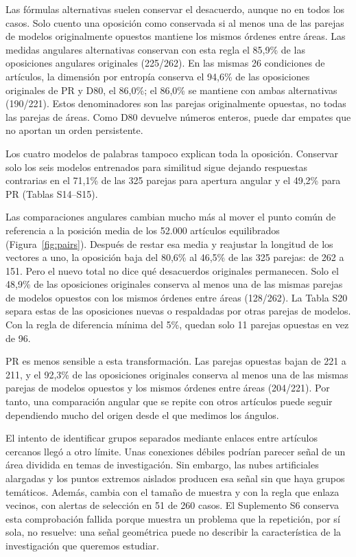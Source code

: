 \documentclass[12pt]{article}
\begin{document}
Las fórmulas alternativas suelen conservar el desacuerdo, aunque no en todos los casos. Solo cuento una oposición como conservada si al menos una de las parejas de modelos originalmente opuestos mantiene los mismos órdenes entre áreas. Las medidas angulares alternativas conservan con esta regla el 85,9\% de las oposiciones angulares originales (225/262). En las mismas 26 condiciones de artículos, la dimensión por entropía conserva el 94,6\% de las oposiciones originales de PR y D80, el 86,0\%; el 86,0\% se mantiene con ambas alternativas (190/221). Estos denominadores son las parejas originalmente opuestas, no todas las parejas de áreas. Como D80 devuelve números enteros, puede dar empates que no aportan un orden persistente.

Los cuatro modelos de palabras tampoco explican toda la oposición. Conservar solo los seis modelos entrenados para similitud sigue dejando respuestas contrarias en el 71,1\% de las 325 parejas para apertura angular y el 49,2\% para PR (Tablas S14--S15).

Las comparaciones angulares cambian mucho más al mover el punto común de referencia a la posición media de los 52.000 artículos equilibrados (Figura~\ref{fig:pairs}). Después de restar esa media y reajustar la longitud de los vectores a uno, la oposición baja del 80,6\% al 46,5\% de las 325 parejas: de 262 a 151. Pero el nuevo total no dice qué desacuerdos originales permanecen. Solo el 48,9\% de las oposiciones originales conserva al menos una de las mismas parejas de modelos opuestos con los mismos órdenes entre áreas (128/262). La Tabla S20 separa estas de las oposiciones nuevas o respaldadas por otras parejas de modelos. Con la regla de diferencia mínima del 5\%, quedan solo 11 parejas opuestas en vez de 96.

PR es menos sensible a esta transformación. Las parejas opuestas bajan de 221 a 211, y el 92,3\% de las oposiciones originales conserva al menos una de las mismas parejas de modelos opuestos y los mismos órdenes entre áreas (204/221). Por tanto, una comparación angular que se repite con otros artículos puede seguir dependiendo mucho del origen desde el que medimos los ángulos.

El intento de identificar grupos separados mediante enlaces entre artículos cercanos llegó a otro límite. Unas conexiones débiles podrían parecer señal de un área dividida en temas de investigación. Sin embargo, las nubes artificiales alargadas y los puntos extremos aislados producen esa señal sin que haya grupos temáticos. Además, cambia con el tamaño de muestra y con la regla que enlaza vecinos, con alertas de selección en 51 de 260 casos. El Suplemento S6 conserva esta comprobación fallida porque muestra un problema que la repetición, por sí sola, no resuelve: una señal geométrica puede no describir la característica de la investigación que queremos estudiar.
\end{document}
